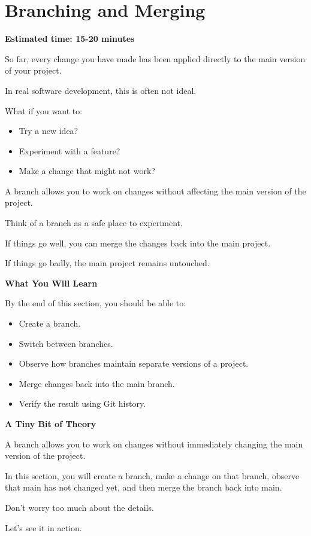 \documentclass{csc2059practical}
\begin{document}
\section{Branching and Merging}
\begin{infobox}
\textbf{Estimated time: 15-20 minutes}
\end{infobox}
So far, every change you have made has been applied directly to the main version of your project.

In real software development, this is often not ideal.

What if you want to:

\begin{itemize}
  \item Try a new idea?
  \item Experiment with a feature?
  \item Make a change that might not work?
\end{itemize}
A branch allows you to work on changes without affecting the main version of the project.

Think of a branch as a safe place to experiment.

If things go well, you can merge the changes back into the main project.

If things go badly, the main project remains untouched.

\begin{learningoutcomes}
\textbf{What You Will Learn}\par
\medskip
By the end of this section, you should be able to:

\begin{itemize}
  \item Create a branch.
  \item Switch between branches.
  \item Observe how branches maintain separate versions of a project.
  \item Merge changes back into the main branch.
  \item Verify the result using Git history.
\end{itemize}
\textbf{A Tiny Bit of Theory}

A branch allows you to work on changes without immediately changing the main version of the project.

In this section, you will create a branch, make a change on that branch, observe that main has not changed yet, and then merge the branch back into main.

Don't worry too much about the details.

Let's see it in action.

\end{learningoutcomes}
\end{document}
